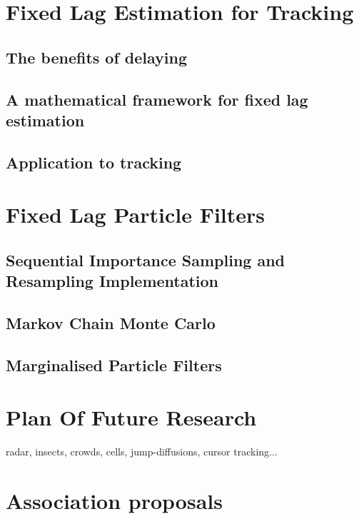 \documentclass{RJWThesis}
\begin{document}
\chapter{Fixed Lag Estimation for Tracking}\label{FixedLag}
\section{The benefits of delaying}

\section{A mathematical framework for fixed lag estimation}
\label{sec:FixedLag2}
\section{Application to tracking}\label{FixedLag_App}


\chapter{Fixed Lag Particle Filters}
\section{Sequential Importance Sampling and Resampling Implementation}

\section{Markov Chain Monte Carlo}

\section{Marginalised Particle Filters}


\chapter{Plan Of Future Research}
radar, insects, crowds, cells, jump-diffusions, cursor tracking...

\cleardoublepage

\appendix
\chapter{Association proposals}




\end{document}
